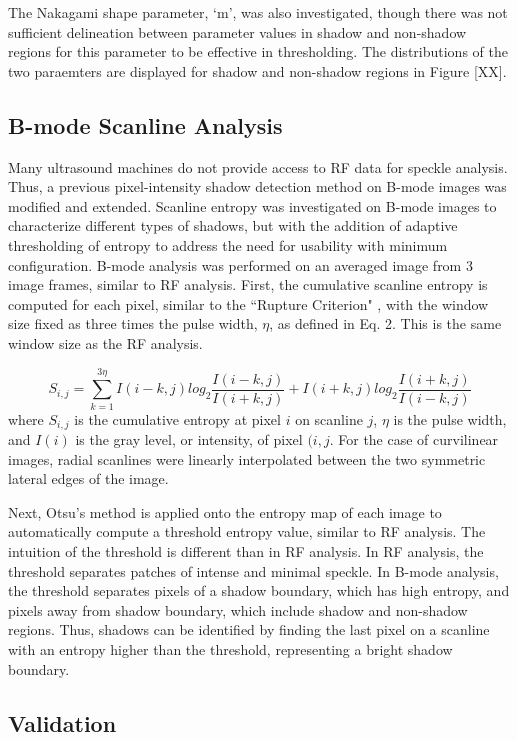 \documentclass[authoryear,preprint,review,12pt]{elsarticle}
\begin{document}
The Nakagami shape parameter, ‘m’, was also investigated, though there was not sufficient delineation between parameter values in shadow and non-shadow regions for this parameter to be effective in thresholding. The distributions of the two paraemters are displayed for shadow and non-shadow regions in Figure [XX].
\subsection*{B-mode Scanline Analysis}

Many ultrasound machines do not provide access to RF data for speckle analysis. Thus, a previous pixel-intensity shadow detection method on B-mode images was modified and extended. Scanline entropy was investigated on B-mode images to characterize different types of shadows, but with the addition of adaptive thresholding of entropy to address the need for usability with minimum configuration. B-mode analysis was performed on  an averaged image from 3 image frames, similar to RF analysis. First, the cumulative scanline entropy is computed for each pixel, similar to the ``Rupture Criterion" \citep{Hellier2010}, with the window size fixed as three times the pulse width, $\eta$, as defined in Eq. 2. This is the same window size as the RF analysis.

\begin{equation}
S_{i,j} = \sum_{k=1}^{3\eta}I(i-k,j)log_{2}\frac{I(i-k,j)}{I(i+k,j)}+I(i+k,j)log_{2}\frac{I(i+k,j)}{I(i-k,j)}
\end{equation} where $S_{i,j}$ is the cumulative entropy at pixel $i$ on scanline $j$, $\eta$ is the pulse width, and $I(i)$ is the gray level, or intensity, of pixel $(i,j$. For the case of curvilinear images, radial scanlines were linearly interpolated between the two symmetric lateral edges of the image.

Next, Otsu's method is applied onto the entropy map of each image to automatically compute a threshold entropy value, similar to RF analysis. The intuition of the threshold is different than in RF analysis. In RF analysis, the threshold separates patches of intense and minimal speckle. In B-mode analysis, the threshold separates pixels of a shadow boundary, which has high entropy, and pixels away from shadow boundary, which include shadow and non-shadow regions. Thus, shadows can be identified by finding the last pixel on a scanline with an entropy higher than the threshold, representing a bright shadow boundary.


\subsection*{Validation}
\end{document}
